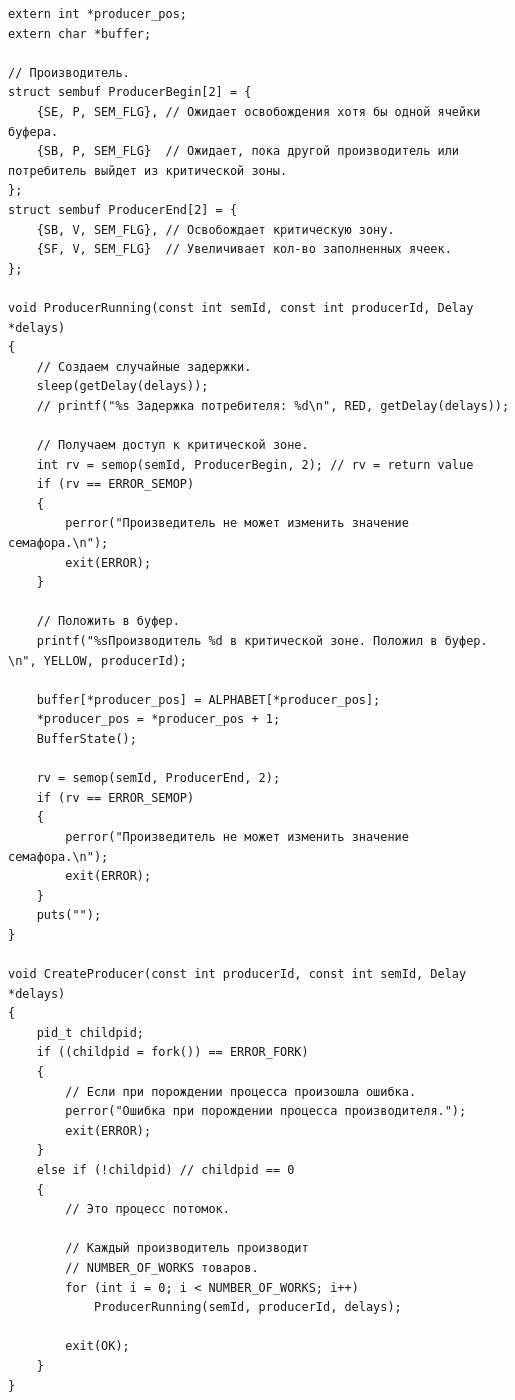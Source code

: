 \begin{lstlisting}[label=some-code,caption=Производитель]
extern int *producer_pos;
extern char *buffer;

// Производитель.
struct sembuf ProducerBegin[2] = {
	{SE, P, SEM_FLG}, // Ожидает освобождения хотя бы одной ячейки буфера.
	{SB, P, SEM_FLG}  // Ожидает, пока другой производитель или потребитель выйдет из критической зоны.
};
struct sembuf ProducerEnd[2] = {
	{SB, V, SEM_FLG}, // Освобождает критическую зону.
	{SF, V, SEM_FLG}  // Увеличивает кол-во заполненных ячеек.
};

void ProducerRunning(const int semId, const int producerId, Delay *delays)
{
	// Создаем случайные задержки.
	sleep(getDelay(delays));
	// printf("%s Задержка потребителя: %d\n", RED, getDelay(delays));

	// Получаем доступ к критической зоне.
	int rv = semop(semId, ProducerBegin, 2); // rv = return value
	if (rv == ERROR_SEMOP)
	{
		perror("Произведитель не может изменить значение семафора.\n");
		exit(ERROR);
	}

	// Положить в буфер.
	printf("%sПроизводитель %d в критической зоне. Положил в буфер. \n", YELLOW, producerId);

	buffer[*producer_pos] = ALPHABET[*producer_pos];
	*producer_pos = *producer_pos + 1;
	BufferState();

	rv = semop(semId, ProducerEnd, 2);
	if (rv == ERROR_SEMOP)
	{
		perror("Произведитель не может изменить значение семафора.\n");
		exit(ERROR);
	}
	puts("");
}

void CreateProducer(const int producerId, const int semId, Delay *delays)
{
	pid_t childpid;
	if ((childpid = fork()) == ERROR_FORK)
	{
		// Если при порождении процесса произошла ошибка.
		perror("Ошибка при порождении процесса производителя.");
		exit(ERROR);
	}
	else if (!childpid) // childpid == 0
	{
		// Это процесс потомок.

		// Каждый производитель производит
		// NUMBER_OF_WORKS товаров.
		for (int i = 0; i < NUMBER_OF_WORKS; i++)
			ProducerRunning(semId, producerId, delays);

		exit(OK);
	}
}
\end{lstlisting}

